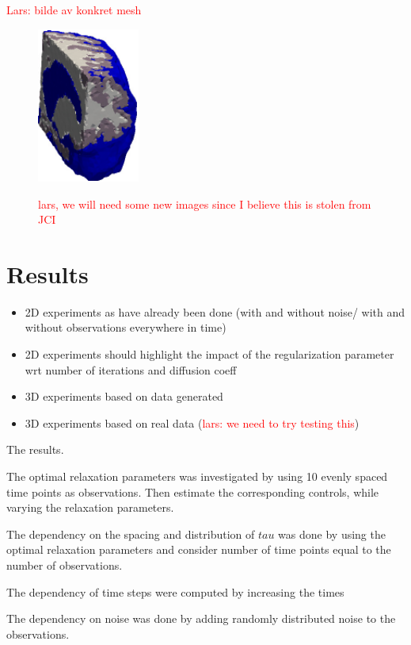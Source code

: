 \documentclass[11pt,a4paper]{article}
\renewcommand{\comment}[1]{\textcolor{red}{#1}}
\begin{document}
\comment{Lars: bilde av konkret mesh  }

\begin{figure}
\includegraphics[width=0.3\textwidth]{mesh-eps-converted-to.pdf} 
\label{fig1} 
\caption{\comment{lars, we will need some new images since I believe this is stolen from JCI}}
\end{figure}


\section{Results}
\begin{itemize}
\item 2D experiments as have already been done (with and without noise/ with and without observations everywhere in time) 
\item 2D experiments should highlight the impact of the regularization parameter wrt number of iterations and diffusion 
coeff 
\item 3D experiments based on data generated  
\item 3D experiments based on real data (\comment{lars: we need to try testing this}) 
\end{itemize}



The results.

The optimal relaxation parameters was investigated by using 10 evenly spaced time points as observations. Then estimate the corresponding controls, while varying the relaxation parameters.


The dependency on the spacing and distribution of $tau$ was done by using the optimal relaxation parameters and consider number of time points equal to the number of observations. 


The dependency of time steps were computed by increasing the times



The dependency on noise was done by adding randomly distributed noise to the observations.
\end{document}
